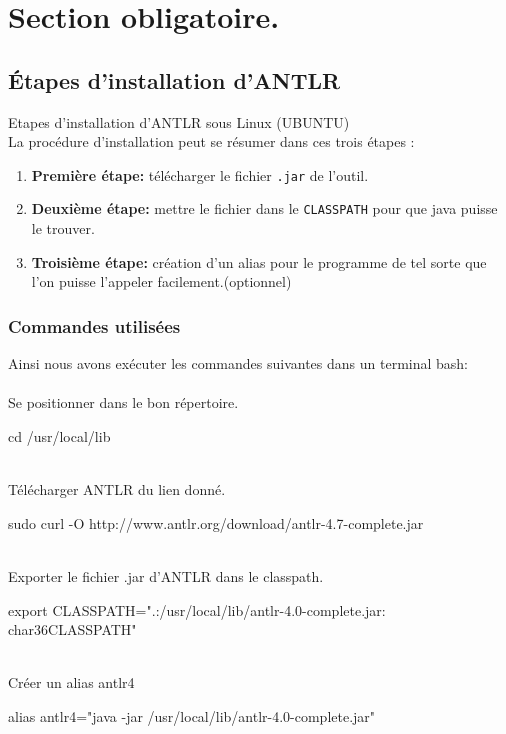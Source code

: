 \documentclass[12pt]{article}
\begin{document}
\def\reporttitle{Réalisation d'un mini-compilateur pour le langage: TinyLanguage\_SII en utilisant ANTLR avec génération du code objet.}


\tableofcontents
\setcounter{tocdepth}{3}

\newpage


\section{Section obligatoire.}
\subsection{Étapes d'installation d'ANTLR }

Etapes d'installation d'ANTLR sous Linux (UBUNTU)\\

La procédure d'installation peut se résumer dans ces trois étapes : \\
\begin{enumerate}
    \item \textbf{Première étape:} télécharger le fichier \texttt{.jar} de l'outil.
    \item \textbf{Deuxième étape:} mettre le fichier dans le \texttt{CLASSPATH} pour que java puisse le trouver. 
    \item \textbf{Troisième étape:} création d'un alias pour le programme de tel sorte que l'on puisse l'appeler facilement.(optionnel)
\end{enumerate}

\subsubsection{Commandes utilisées}
Ainsi nous avons exécuter les commandes suivantes dans un terminal  bash:\\
\texttt{ }\\
Se positionner dans le bon répertoire.
\begin{sql}
cd /usr/local/lib
\end{sql}
\texttt{ }\\
Télécharger ANTLR du lien donné.
\begin{sql}  
sudo curl -O http://www.antlr.org/download/antlr-4.7-complete.jar
\end{sql}
\texttt{ }\\
Exporter le fichier .jar d'ANTLR dans le classpath.
\begin{sql}
export CLASSPATH=".:/usr/local/lib/antlr-4.0-complete.jar:\\char36CLASSPATH"
\end{sql}
\texttt{ }\\
Créer un alias antlr4
\textbf{}
\begin{sql}
alias antlr4="java -jar /usr/local/lib/antlr-4.0-complete.jar"
\end{sql}
\end{document}
